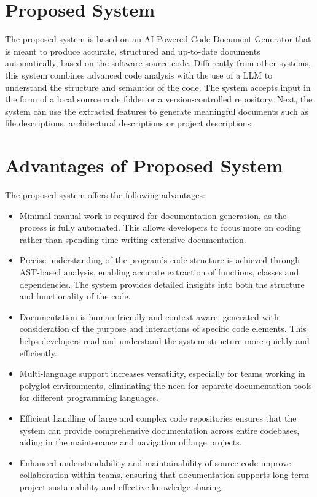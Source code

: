 \section{Proposed System}
\hspace{0.5cm}
The proposed system is based on an AI-Powered Code Document Generator that is meant to produce accurate, structured and up-to-date documents automatically, based on the software source code. Differently from other systems, this system combines advanced code analysis with the use of a LLM to understand the structure and semantics of the code. The system accepts input in the form of a local source code folder or a version-controlled repository. Next, the system can use the extracted features to generate meaningful documents such as file descriptions, architectural descriptions or project descriptions. 

\section{Advantages of Proposed System}
\hspace{0.5cm}
The proposed system offers the following advantages:

\begin{itemize}
\item Minimal manual work is required for documentation generation, as the process is fully automated. This allows developers to focus more on coding rather than spending time writing extensive documentation.
\item Precise understanding of the program’s code structure is achieved through AST-based analysis, enabling accurate extraction of functions, classes and dependencies. The system provides detailed insights into both the structure and functionality of the code.
\item Documentation is human-friendly and context-aware, generated with consideration of the purpose and interactions of specific code elements. This helps developers read and understand the system structure more quickly and efficiently.
\item Multi-language support increases versatility, especially for teams working in polyglot environments, eliminating the need for separate documentation tools for different programming languages.
\item Efficient handling of large and complex code repositories ensures that the system can provide comprehensive documentation across entire codebases, aiding in the maintenance and navigation of large projects.
\item Enhanced understandability and maintainability of source code improve collaboration within teams, ensuring that documentation supports long-term project sustainability and effective knowledge sharing.
\end{itemize}
